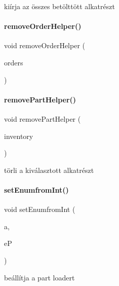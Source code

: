 kiírja az összes betölttött alkatrészt 

\mbox{\label{_menu_8cpp_aed744d8c7e74c041565714ecfb656f0b}} 
\paragraph{\texorpdfstring{removeOrderHelper()}{removeOrderHelper()}}
{\footnotesize\ttfamily void remove\+Order\+Helper (\begin{DoxyParamCaption}\item[{\mbox{\hyperlink{class_orders}{Orders}} \&}]{orders }\end{DoxyParamCaption})}

\mbox{\label{_menu_8cpp_ad31a3966104aedb59abe49cf8fa7b33e}} 
\paragraph{\texorpdfstring{removePartHelper()}{removePartHelper()}}
{\footnotesize\ttfamily void remove\+Part\+Helper (\begin{DoxyParamCaption}\item[{\mbox{\hyperlink{class_inventory}{Inventory}} \&}]{inventory }\end{DoxyParamCaption})}



törli a kiválasztott alkatrészt 

\mbox{\label{_menu_8cpp_a4b1c8fae94d189d0d74b10cde7b75176}} 
\paragraph{\texorpdfstring{setEnumfromInt()}{setEnumfromInt()}}
{\footnotesize\ttfamily void set\+Enumfrom\+Int (\begin{DoxyParamCaption}\item[{int}]{a,  }\item[{\mbox{\hyperlink{_parts_8h_abddff37837f171d72a2e16a1448a3943}{enum\+Part}} \&}]{eP }\end{DoxyParamCaption})}



beállítja a part loadert 

